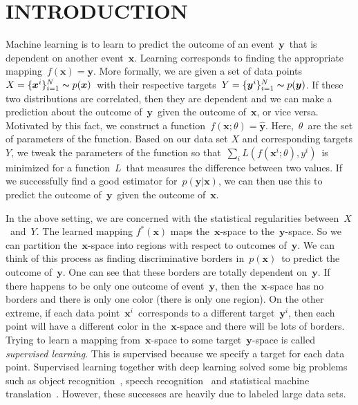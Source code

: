 \documentclass[a4paper,onesided,12pt]{report}
\begin{document}
\begin{abbreviations}
\end{abbreviations}


\chapter{INTRODUCTION}
\label{chapter:introduction}
Machine learning is to learn to predict the outcome of an event~$\boldsymbol{y}$~that is dependent on another event~$\boldsymbol{x}$. Learning corresponds to finding the appropriate mapping~$f(\boldsymbol{x})=\boldsymbol{y}$. More formally, we are given a set of data points~$X=\{\boldsymbol{x}^i\}_{i=1}^{N}\thicksim p(\boldsymbol{x})$~with their respective targets~$Y=\{\boldsymbol{y}^i\}_{i=1}^{N}\thicksim p(\boldsymbol{y})$. If these two distributions are correlated, then they are dependent and we can make a prediction about the outcome of~$\boldsymbol{y}$~given the outcome of~$\boldsymbol{x}$, or vice versa. Motivated by this fact, we construct a function~$f(\boldsymbol{x}; \theta)=\hat{\boldsymbol{y}}$. Here,~$\theta$~are the set of parameters of the function. Based on our data set $X$ and corresponding targets $Y$, we tweak the parameters of the function so that~$\sum_i L(f(\boldsymbol{x}^i; \theta), y^i)$~is minimized for a function~$L$~that measures the difference between two values. If we successfully find a good estimator for~$p(\boldsymbol{y}|\boldsymbol{x})$, we can then use this to predict the outcome of~$\boldsymbol{y}$~given the outcome of~$\boldsymbol{x}$.

In the above setting, we are concerned with the statistical regularities between~$X$~and~$Y$. The learned mapping $f^{*}(\boldsymbol{x})$ maps the~$\boldsymbol{x}$-space to the~$\boldsymbol{y}$-space. So we can partition the~$\boldsymbol{x}$-space into regions with respect to outcomes of~$\boldsymbol{y}$. We can think of this process as finding discriminative borders in~$p(\boldsymbol{x})$~to predict the outcome of~$\boldsymbol{y}$. One can see that these borders are totally dependent on~$\boldsymbol{y}$. If there happens to be only one outcome of event~$\boldsymbol{y}$, then the~$\boldsymbol{x}$-space has no borders and there is only one color (there is only one region). On the other extreme, if each data point~$\boldsymbol{x}^i$~corresponds to a different target~$\boldsymbol{y}^i$, then each point will have a different color in the~$\boldsymbol{x}$-space and there will be lots of borders. Trying to learn a mapping from~$\boldsymbol{x}$-space to some target~$\boldsymbol{y}$-space is called \emph{supervised learning}. This is supervised because we specify a target for each data point. Supervised learning together with deep learning solved some big problems such as object recognition~\cite{alexnet}, speech recognition~\cite{acoustic} and statistical machine translation~\cite{seq2seq}. However, these successes are heavily due to labeled large data sets.
\end{document}
